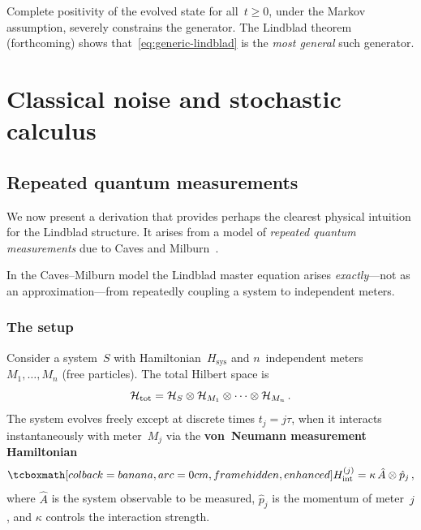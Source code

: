 \begin{intuition}
  Complete positivity of the evolved state for all~$t \geq 0$, under
  the Markov assumption, severely constrains the generator.  The
  Lindblad theorem (forthcoming) shows
  that~\eqref{eq:generic-lindblad} is the \emph{most general} such
  generator.
\end{intuition}

\section{Classical noise and stochastic calculus}%
\label{sec:classical-noise}

\subsection{Repeated quantum measurements}%
\label{sec:repeated-measurements}

We now present a derivation that provides perhaps the clearest
physical intuition for the Lindblad structure.  It arises from a model
of \emph{repeated quantum measurements} due to Caves and
Milburn~\cite{CavesMilburn87}.

\begin{historical}
  In the Caves--Milburn model the Lindblad master equation arises
  \emph{exactly}---not as an approximation---from repeatedly coupling
  a system to independent meters.
\end{historical}

\subsubsection{The setup}

Consider a system~$S$ with Hamiltonian~$H_{\mathrm{sys}}$ and
$n$~independent meters $M_1, \ldots, M_n$ (free particles).  The
total Hilbert space is
\begin{equation}\label{eq:total-hilb}
  \mathcal{H}_{\mathrm{tot}}
  = \mathcal{H}_S \otimes \mathcal{H}_{M_1} \otimes \cdots \otimes \mathcal{H}_{M_n}\,.
\end{equation}
The system evolves freely except at discrete times $t_j = j\tau$,
when it interacts instantaneously with meter~$M_j$ via the
\textbf{von~Neumann measurement Hamiltonian}
\begin{equation}\label{eq:vn-hamiltonian}
  \eqbox{H_{\mathrm{int}}^{(j)}
  = \kappa\, \hat{A} \tp \hat{p}_j}\,,
\end{equation}
where $\hat{A}$ is the system observable to be measured, $\hat{p}_j$
is the momentum of meter~$j$, and $\kappa$ controls the interaction
strength.

